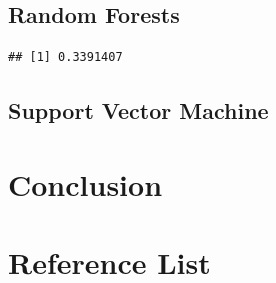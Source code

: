 \documentclass[11pt,preprint, authoryear]{elsarticle}
\numberwithin{equation}{section}
\numberwithin{figure}{section}
\numberwithin{table}{section}
\begin{document}
\hypertarget{random-forests}{%
\subsection{Random Forests}\label{random-forests}}

\begin{verbatim}
## [1] 0.3391407
\end{verbatim}

\hypertarget{support-vector-machine}{%
\subsection{Support Vector Machine}\label{support-vector-machine}}

\hypertarget{conclusion}{%
\section{Conclusion}\label{conclusion}}

\hypertarget{reference-list}{%
\section{Reference List}\label{reference-list}}


\end{document}
